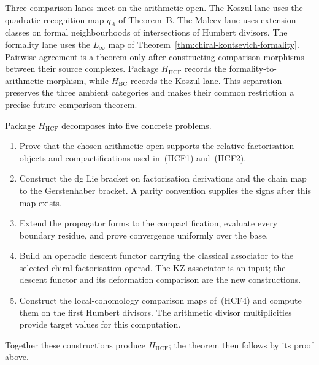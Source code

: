 \begin{remark}
\label{rem:bar-cobar-three-angles-kontsevich}
%
Three comparison lanes meet on the arithmetic open.  The Koszul lane
uses the quadratic recognition map $q_A$ of Theorem~B.  The Malcev lane
uses extension classes on formal neighbourhoods of intersections of
Humbert divisors.  The formality lane uses the $L_\infty$ map of
Theorem~\ref{thm:chiral-kontsevich-formality}.  Pairwise agreement is a
theorem only after constructing comparison morphisms between their
source complexes.  Package $H_{\mathrm{HCF}}$ records the formality-to-
arithmetic morphism, while $H_{\mathrm{BC}}$ records the Koszul lane.
This separation preserves the three ambient categories and makes their
common restriction a precise future comparison theorem.
\end{remark}

\begin{remark}
\label{rem:chiral-kontsevich-formality-tests}
%
Package $H_{\mathrm{HCF}}$ decomposes into five concrete problems.
\begin{enumerate}[label=\textup{(\arabic*)},leftmargin=*]
\item Prove that the chosen arithmetic open supports the relative
factorisation objects and compactifications used in~\textup{(HCF1)}
and~\textup{(HCF2)}.
\item Construct the dg Lie bracket on factorisation derivations and the
chain map to the Gerstenhaber bracket.  A parity convention supplies
the signs after this map exists.
\item Extend the propagator forms to the compactification, evaluate every
boundary residue, and prove convergence uniformly over the base.
\item Build an operadic descent functor carrying the classical associator
to the selected chiral factorisation operad.  The KZ associator is an
input; the descent functor and its deformation comparison are the new
constructions.
\item Construct the local-cohomology comparison maps of~\textup{(HCF4)}
and compute them on the first Humbert divisors.  The arithmetic divisor
multiplicities provide target values for this computation.
\end{enumerate}
Together these constructions produce $H_{\mathrm{HCF}}$; the theorem
then follows by its proof above.
\end{remark}


